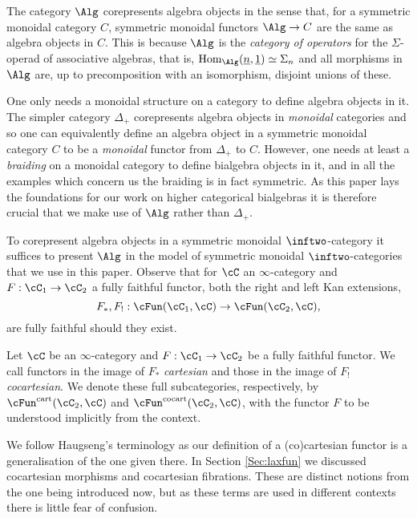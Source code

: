 \documentclass[a4paper]{article}
\numberwithin{equation}{section}
\begin{document}
The category $\Alg$ corepresents algebra objects in the sense that, for a symmetric monoidal category $C$, symmetric monoidal functors $\Alg\to C$ are the same as algebra objects in $C$. This is because $\Alg$ is the {\em category of operators} \cite{MayOps} for the $\Sigma$-operad of associative algebras, that is, ${\rm Hom}_\Alg(\underline{n},\underline{1}) \simeq \Sigma_n$ and all morphisms in $\Alg$ are, up to precomposition with an isomorphism, disjoint unions of these. 

\begin{remark}
 One only needs a monoidal structure on a category to define algebra objects in it. The simpler category $\Delta_+$ corepresents algebra objects in {\em monoidal} categories and so one can equivalently define an algebra object in a symmetric monoidal category $C$ to be a {\em monoidal} functor from $\Delta_+$ to $C$. However, one needs at least a {\em braiding} on a monoidal category to define bialgebra objects in it, and in all the examples which concern us the braiding is in fact symmetric. As this paper lays the foundations for our work on higher categorical bialgebras \cite{penney2017bialg, penney2017bimon} it is therefore crucial that we make use of $\Alg$ rather than $\Delta_+$.
\end{remark}


To corepresent algebra objects in a symmetric monoidal $\inftwo$-category it suffices to present $\Alg$ in the model of symmetric monoidal $\inftwo$-categories that we use in this paper. Observe that for $\cC$ an $\infty$-category and $F:\cC_1 \to \cC_2$ a fully faithful functor, both the right and left Kan extensions,
 \begin{equation*}
  F_*,F_!: \cFun(\cC_1, \cC) \to \cFun(\cC_2, \cC),
 \end{equation*}
are fully faithful should they exist.  
\begin{defn}
\label{RKERem}
 Let $\cC$ be an $\infty$-category and $F:\cC_1 \to \cC_2$ be a fully faithful functor. We call functors in the image of $F_*$ {\em cartesian} and those in the image of $F_!$ {\em cocartesian}. We denote these full subcategories, respectively, by $\cFun^{\rm cart}(\cC_2, \cC)$ and $\cFun^{\rm cocart}(\cC_2,\cC)$, with the functor $F$ to be understood implicitly from the context.
\end{defn}
\begin{remark}
We follow Haugseng's terminology \cite{RuneSpans} as our definition of a (co)cartesian functor is a generalisation of the one given there. In Section \ref{Sec:laxfun} we discussed cocartesian morphisms and cocartesian fibrations. These are distinct notions from the one being introduced now, but as these terms are used in different contexts there is little fear of confusion.
\end{remark}
\end{document}

